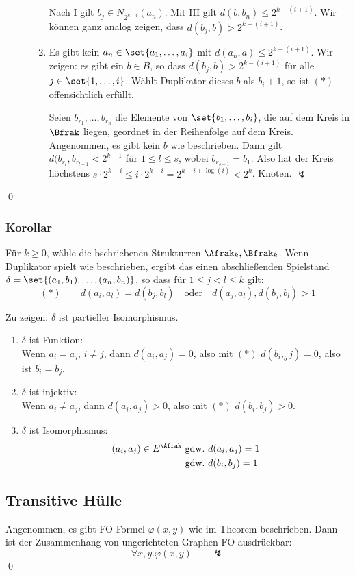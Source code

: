 \begin{description}
\begin{enumerate}
    Nach I gilt $b_j\in N_{2^{k-i}}(a_n)$. Mit III gilt $d(b,b_n)\leq 2^{k-(i+1)}$.
    Wir können ganz analog zeigen, dass $d(b_j,b)>2^{k-(i+1)}$.
    
    \item Es gibt kein $a_n\in\set{a_1,\dots,a_i}$ mit $d(a_n,a)\leq 2^{k-(i+1)}$.
    Wir zeigen: es gibt ein $b\in B$, so dass $d(b_j,b)> 2^{k-(i+1)}$ für
    alle $j\in\set{1,\dots,i}$. Wählt Duplikator dieses $b$ als $b_i+1$, so ist
    $(*)$ offensichtlich erfüllt.
    
    Seien $b_{r_1},\dots,b_{r_n}$ die Elemente von $\set{b_1,\dots,b_i}$, die auf
    dem Kreis in $\Bfrak$ liegen, geordnet in der Reihenfolge auf dem Kreis.
    Angenommen, es gibt kein $b$ wie beschrieben. Dann gilt
    $d(b_{r_l},b_{r_{l+1}} < 2^{k-1}$ für $1\leq l\leq s$, wobei $b_{r_{s+1}}=b_1$.
    Also hat der Kreis höchstens $s\cdot 2^{k-i}\leq i\cdot 2^{k-i} = 2^{k-i+\log(i)} < 2^k$.
    Knoten. $\lightning$
  \end{enumerate}
\end{description}
\qed

\subsubsection{Korollar}

Für $k\geq 0$, wähle die bschriebenen Strukturren $\Afrak_k,\Bfrak_k$.
Wenn Duplikator spielt wie beschrieben, ergibt das einen abschließenden
Spielstand $\delta=\set{(a_1,b_1),\dots,(a_n,b_n)}$, so dass für
$1\leq j<l\leq k$ gilt:
\[
  (*)\qquad d(a_i,a_l)=d(b_j,b_l) \quad\text{oder}\quad d(a_j,a_l),d(b_j,b_l) > 1
\]

Zu zeigen: $\delta$ ist partieller Isomorphismus.

\begin{enumerate}
  \item $\delta$ ist Funktion:\\
  Wenn $a_i=a_j$, $i\not=j$, dann $d(a_i,a_j)=0$, also mit $(*)$
  $d(b_i,_bj)=0$, also ist $b_i=b_j$.
  
  \item $\delta$ ist injektiv:\\
  Wenn $a_i\not=a_j$, dann $d(a_i,a_j)>0$, also mit $(*)$ $d(b_i,b_j)>0$.
  
  \item $\delta$ ist Isomorphismus:
  \begin{align*}
    (a_i,a_j)\in E^\Afrak &~\text{gdw.}~ d(a_i,a_j) = 1\\
                          &~\text{gdw.}~ d(b_i,b_j) = 1\\
  \end{align*}
\end{enumerate}

\subsection{Transitive Hülle}

Angenommen, es gibt FO-Formel $\varphi(x,y)$ wie im Theorem beschrieben.
Dann ist der Zusammenhang von ungerichteten Graphen FO-ausdrückbar:
\[
  \forall x,y.\varphi(x,y)\qquad\lightning
\]
\qed

